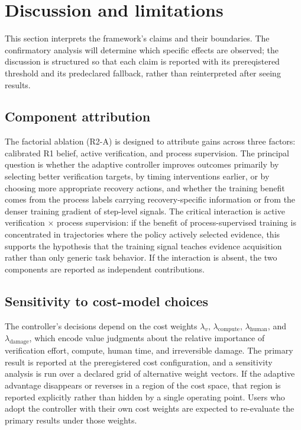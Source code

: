 \section{Discussion and limitations}
\label{sec:discussion}

This section interprets the framework's claims and their boundaries. The
confirmatory analysis will determine which specific effects are observed;
the discussion is structured so that each claim is reported with its
prereqistered threshold and its predeclared fallback, rather than
reinterpreted after seeing results.

\subsection{Component attribution}

The factorial ablation (R2-A) is designed to attribute gains across three
factors: calibrated R1 belief, active verification, and process supervision.
The principal question is whether the adaptive controller improves outcomes
primarily by selecting better verification targets, by timing interventions
earlier, or by choosing more appropriate recovery actions, and whether the
training benefit comes from the process labels carrying recovery-specific
information or from the denser training gradient of step-level signals. The
critical interaction is active verification $\times$ process supervision:
if the benefit of process-supervised training is concentrated in
trajectories where the policy actively selected evidence, this supports the
hypothesis that the training signal teaches evidence acquisition rather
than only generic task behavior. If the interaction is absent, the two
components are reported as independent contributions.

\subsection{Sensitivity to cost-model choices}

The controller's decisions depend on the cost weights $\lambda_v$,
$\lambda_{\text{compute}}$, $\lambda_{\text{human}}$, and
$\lambda_{\text{damage}}$, which encode value judgments about the relative
importance of verification effort, compute, human time, and irreversible
damage. The primary result is reported at the preregistered cost
configuration, and a sensitivity analysis is run over a declared grid of
alternative weight vectors. If the adaptive advantage disappears or reverses
in a region of the cost space, that region is reported explicitly rather
than hidden by a single operating point. Users who adopt the controller
with their own cost weights are expected to re-evaluate the primary results
under those weights.

